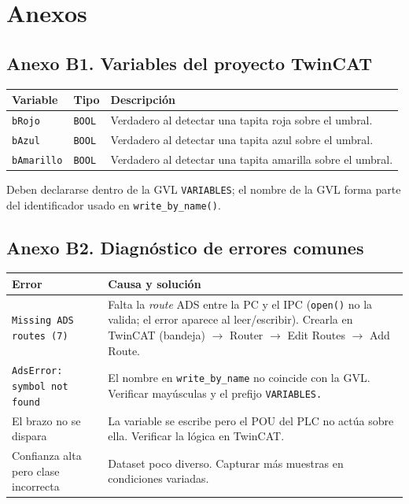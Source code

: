 \section{Anexos}

\subsection*{Anexo B1. Variables del proyecto TwinCAT}

\renewcommand{\arraystretch}{1.2}
\begin{tabularx}{\textwidth}{@{}p{3.0cm} p{2.0cm} X@{}}
\toprule
\textbf{Variable} & \textbf{Tipo} & \textbf{Descripción} \\
\midrule
\texttt{bRojo}     & \texttt{BOOL} & Verdadero al detectar una tapita roja sobre el umbral. \\
\texttt{bAzul}     & \texttt{BOOL} & Verdadero al detectar una tapita azul sobre el umbral. \\
\texttt{bAmarillo} & \texttt{BOOL} & Verdadero al detectar una tapita amarilla sobre el umbral. \\
\bottomrule
\end{tabularx}
\renewcommand{\arraystretch}{1}

Deben declararse dentro de la GVL \texttt{VARIABLES}; el nombre de la GVL forma parte del
identificador usado en \texttt{write\_by\_name()}.

\subsection*{Anexo B2. Diagnóstico de errores comunes}

\renewcommand{\arraystretch}{1.2}
\begin{tabularx}{\textwidth}{@{}p{5.5cm} X@{}}
\toprule
\textbf{Error} & \textbf{Causa y solución} \\
\midrule
\texttt{Missing ADS routes (7)} & Falta la \emph{route} ADS entre la PC y el IPC (\texttt{open()} no la valida; el error aparece al leer/escribir). Crearla en TwinCAT (bandeja) $\rightarrow$ Router $\rightarrow$ Edit Routes $\rightarrow$ Add Route. \\
\texttt{AdsError: symbol not found} & El nombre en \texttt{write\_by\_name} no coincide con la GVL. Verificar mayúsculas y el prefijo \texttt{VARIABLES.} \\
El brazo no se dispara & La variable se escribe pero el POU del PLC no actúa sobre ella. Verificar la lógica en TwinCAT. \\
Confianza alta pero clase incorrecta & Dataset poco diverso. Capturar más muestras en condiciones variadas. \\
\bottomrule
\end{tabularx}
\renewcommand{\arraystretch}{1}
